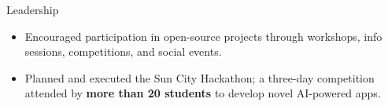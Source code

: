 \documentclass{resume} %
\begin{document}
\begin{workSection}{Leadership}
    
    \customItem[
    	title=President \& Founder - Free and Open-Source Software Club at UTEP,
    	duration=Spring 2024 - Present
    ]
    \begin{itemize}
    	\vspace{-0.5em}
    	\itemsep -6pt {}
    	\item Encouraged participation in open-source projects through workshops, info sessions, competitions, and social events.
    \end{itemize}

    \customItem[
        title=Treasurer - Association for Computing Machinery at UTEP,
        duration=Fall 2022 - Present
    ]
    \begin{itemize}
        \vspace{-0.5em}
        \itemsep -6pt {}
        \item Planned and executed the Sun City Hackathon; a three-day competition attended by \textbf{more than 20 students} to develop novel AI-powered apps.
    \end{itemize}
\end{workSection}

\end{document}

